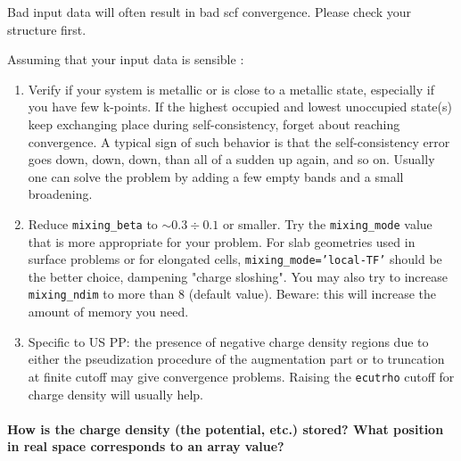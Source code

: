 \documentclass[12pt,a4paper]{article}
\begin{document}
Bad input data will often result in bad scf
convergence. Please check your structure first.
 
Assuming that your input data is sensible :
\begin{enumerate}
\item Verify if your system is metallic or is close to a metallic
  state, especially if you have few k-points. If the highest occupied
  and lowest unoccupied state(s) keep exchanging place during
  self-consistency, forget about reaching convergence. A typical sign
  of such behavior is that the self-consistency error goes down, down,
  down, than all of a sudden up again, and so on. Usually one can
  solve the problem by adding a few empty bands and a small
  broadening. 
\item Reduce \texttt{mixing\_beta} to $\sim 0.3\div
  0.1$ or smaller. Try the \texttt{mixing\_mode} value that is more
  appropriate for your problem. For slab geometries used in surface
  problems or for elongated cells,  \texttt{mixing\_mode='local-TF'}
  should be the better choice, dampening "charge sloshing". You may
  also try to increase \texttt{mixing\_ndim} to more than 8 (default
  value). Beware: this will increase the amount of memory you need. 
\item Specific to US PP: the presence of negative charge density
  regions due to either the pseudization procedure of the augmentation
  part or to truncation at finite cutoff may give convergence
  problems. Raising the \texttt{ecutrho} cutoff for charge density will
  usually help.
\end{enumerate}

\paragraph{How is the charge density (the potential, etc.) stored? 
What position in real space corresponds to an array value?}
\end{document}
